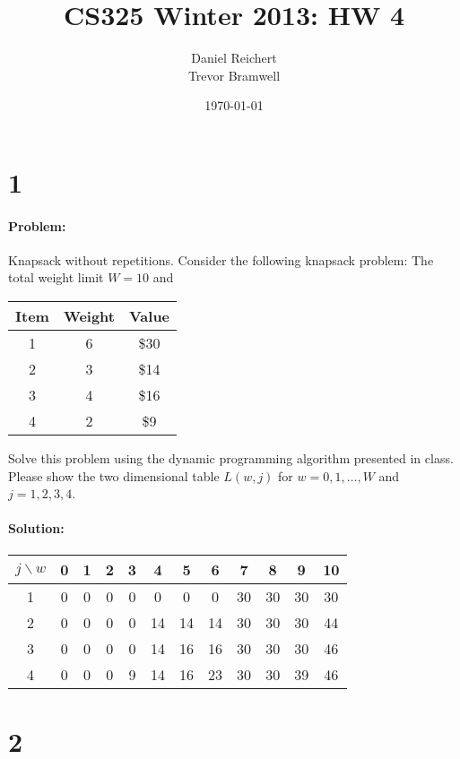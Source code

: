 \documentclass[12pt]{article}
\title{CS325 Winter 2013: HW 4}
\author{
    Daniel Reichert \\
    Trevor Bramwell \\
}
\date{\today}
\begin{document}
\maketitle
\section*{1}
\paragraph{Problem:}
Knapsack without repetitions. Consider the following knapsack problem:
The total weight limit $W = 10$ and \\
\begin{center}
\begin{tabular}{ c | c | c }
    Item & Weight & Value \\ \hline
    1 & 6 & \$30 \\
    2 & 3 & \$14 \\
    3 & 4 & \$16 \\
    4 & 2 & \$9  \\ \hline
\end{tabular}
\end{center}
Solve this problem using the dynamic programming algorithm presented in class. Please show the two
dimensional table $L(w, j)$ for $w = 0, 1, \dots, W$ and $j = 1, 2, 3, 4$.

\paragraph{Solution:}
\begin{center}
\begin{tabular}{ c || c | c | c | c | c | c | c | c | c | c | c }
  $j \backslash w$ & 0 & 1 & 2 & 3 & 4 & 5 & 6 & 7 & 8 & 9 & 10 \\ \hline \hline
  1 & 0 & 0 & 0 & 0 & 0 & 0 & 0 & 30 & 30 & 30 & 30 \\ \hline
  2 & 0 & 0 & 0 & 0 & 14 & 14 & 14 & 30 & 30 & 30 & 44 \\ \hline
  3 & 0 & 0 & 0 & 0 & 14 & 16 & 16 & 30 & 30 & 30 & 46 \\ \hline
  4 & 0 & 0 & 0 & 9 & 14 & 16 & 23 & 30 & 30 & 39 & 46 \\ \hline
\end{tabular}
\end{center}

\section*{2}
\end{document}
